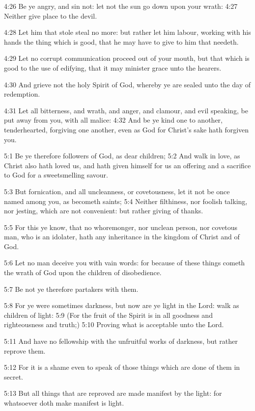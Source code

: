 4:26 Be ye angry, and sin not: let not the sun go down upon your wrath: 4:27 Neither give place to the devil.

4:28 Let him that stole steal no more: but rather let him labour, working with his hands the thing which is good, that he may have to give to him that needeth.

4:29 Let no corrupt communication proceed out of your mouth, but that which is good to the use of edifying, that it may minister grace unto the hearers.

4:30 And grieve not the holy Spirit of God, whereby ye are sealed unto the day of redemption.

4:31 Let all bitterness, and wrath, and anger, and clamour, and evil speaking, be put away from you, with all malice: 4:32 And be ye kind one to another, tenderhearted, forgiving one another, even as God for Christ's sake hath forgiven you.

5:1 Be ye therefore followers of God, as dear children; 5:2 And walk in love, as Christ also hath loved us, and hath given himself for us an offering and a sacrifice to God for a sweetsmelling savour.

5:3 But fornication, and all uncleanness, or covetousness, let it not be once named among you, as becometh saints; 5:4 Neither filthiness, nor foolish talking, nor jesting, which are not convenient: but rather giving of thanks.

5:5 For this ye know, that no whoremonger, nor unclean person, nor covetous man, who is an idolater, hath any inheritance in the kingdom of Christ and of God.

5:6 Let no man deceive you with vain words: for because of these things cometh the wrath of God upon the children of disobedience.

5:7 Be not ye therefore partakers with them.

5:8 For ye were sometimes darkness, but now are ye light in the Lord: walk as children of light: 5:9 (For the fruit of the Spirit is in all goodness and righteousness and truth;) 5:10 Proving what is acceptable unto the Lord.

5:11 And have no fellowship with the unfruitful works of darkness, but rather reprove them.

5:12 For it is a shame even to speak of those things which are done of them in secret.

5:13 But all things that are reproved are made manifest by the light: for whatsoever doth make manifest is light.

